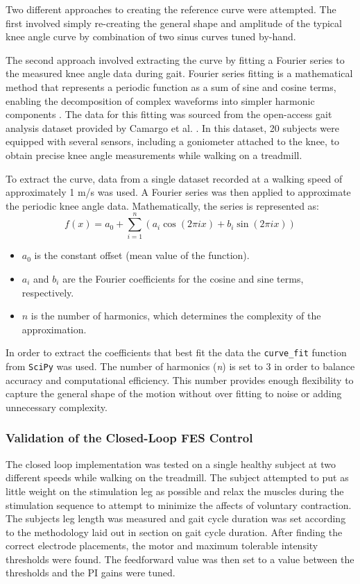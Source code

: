 Two different approaches to creating the reference curve were attempted. The first involved simply re-creating the general shape and amplitude of the typical knee angle curve by combination of two sinus curves tuned by-hand. 

The second approach involved extracting the curve by fitting a Fourier series to the measured knee angle data during gait. Fourier series fitting is a mathematical method that represents a periodic function as a sum of sine and cosine terms, enabling the decomposition of complex waveforms into simpler harmonic components \cite{blackledget_chapter_2006}. The data for this fitting was sourced from the open-access gait analysis dataset provided by Camargo et al. \cite{camargo_comprehensive_2021}. In this dataset, 20 subjects were equipped with several sensors, including a goniometer attached to the knee, to obtain precise knee angle measurements while walking on a treadmill.

To extract the curve, data from a single dataset recorded at a walking speed of approximately 1 m/s was used. A Fourier series was then applied to approximate the periodic knee angle data. Mathematically, the series is represented as:
\begin{equation}
f(x) = a_0 + \sum_{i=1}^{n} \left( a_i \cos(2\pi i x) + b_i \sin(2\pi i x) \right)
\end{equation}

\begin{itemize}
    \item \(a_0\) is the constant offset (mean value of the function).
    \item \(a_i\) and \(b_i\) are the Fourier coefficients for the cosine and sine terms, respectively.
    \item \(n\) is the number of harmonics, which determines the complexity of the approximation.
\end{itemize}

In order to extract the coefficients that best fit the data the \texttt{curve\_fit} function from \texttt{SciPy} was used. The number of harmonics (\textit{n}) is set to 3 in order to balance accuracy and computational efficiency. This number provides enough flexibility to capture the general shape of the motion without over fitting to noise or adding unnecessary complexity.

\subsubsection{Validation of the Closed-Loop FES Control}
The closed loop implementation was tested on a single healthy subject at two different speeds while walking on the treadmill. The subject attempted to put as little weight on the stimulation leg as possible and relax the muscles during the stimulation sequence to attempt to minimize the affects of voluntary contraction. The subjects leg length was measured and gait cycle duration was set according to the methodology laid out in section on gait cycle duration. After finding the correct electrode placements, the motor and maximum tolerable intensity thresholds were found. The feedforward value was then set to a value between the thresholds and the PI gains were tuned. 
\newpage
